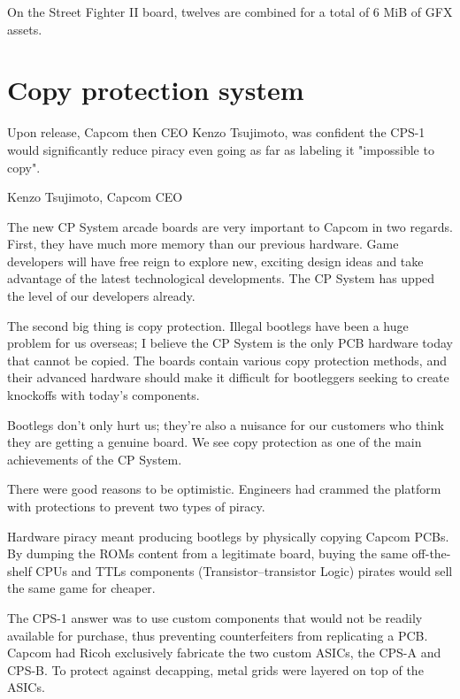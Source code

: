 
On the Street Fighter II board, twelves  are combined for a total of 6 MiB of GFX assets.



\section{Copy protection system}

Upon release, Capcom then CEO Kenzo Tsujimoto, was confident the CPS-1 would significantly reduce piracy even going as far as labeling it "impossible to copy".

\begin{q}{Kenzo Tsujimoto, Capcom CEO\cite{gamest38}}
    
The new CP System arcade boards are very important to Capcom in two regards. First, they have much more memory than our previous hardware. Game developers will have free reign to explore new, exciting design ideas and take advantage of the latest technological developments. The CP System has upped the level of our developers already.

The second big thing is copy protection. Illegal bootlegs have been a huge problem for us overseas; I believe the CP System is the only PCB hardware today that cannot be copied. The boards contain various copy protection methods, and their advanced hardware should make it difficult for bootleggers seeking to create knockoffs with today's components. 

Bootlegs don't only hurt us; they're also a nuisance for our customers who think they are getting a genuine board. We see copy protection as one of the main achievements of the CP System.
\end{q}


There were good reasons to be optimistic. Engineers had crammed the platform with protections to prevent two types of piracy.


Hardware piracy meant producing bootlegs by physically copying Capcom PCBs. By dumping the ROMs content from a legitimate board, buying the same off-the-shelf CPUs and TTLs components (Transistor–transistor Logic) pirates would sell the same game  for cheaper.

The CPS-1 answer was to use custom components that would not be readily available for purchase, thus preventing counterfeiters from replicating a PCB. Capcom had Ricoh exclusively fabricate the two custom ASICs, the CPS-A and CPS-B. To protect against decapping, metal grids were layered on top of the ASICs\cite{arcadeHackerCPS1Rev}. 


